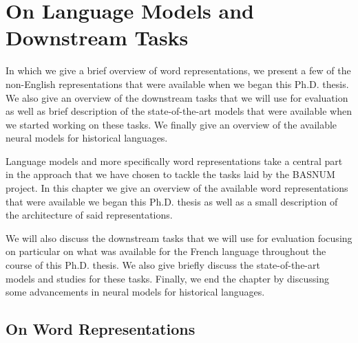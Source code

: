 \chapter{On Language Models and Downstream Tasks}

\begin{center}
    \begin{minipage}{0.66\textwidth}
        \begin{small}
            In which we give a brief overview of word representations, we present a few of the non-English representations that were available when we began this Ph.D. thesis. We also give an overview of the downstream tasks that we will use for evaluation as well as brief description of the state-of-the-art models that were available when we started working on these tasks. We finally give an overview of the available neural models for historical languages. 
        \end{small}
    \end{minipage}
    \vspace{0.5cm}
\end{center}

Language models and more specifically word representations take a central part in the approach that we have chosen to tackle the tasks laid by the BASNUM project. In this chapter we give an overview of the available word representations that were available we began this Ph.D. thesis as well as a small description of the architecture of said representations.

We will also discuss the downstream tasks that we will use for evaluation focusing on particular on what was available for the French language throughout the course of this Ph.D. thesis. We also give briefly discuss the state-of-the-art models and studies for these tasks. Finally, we end the chapter by discussing some advancements in neural models for historical languages.

\section{On Word Representations}

